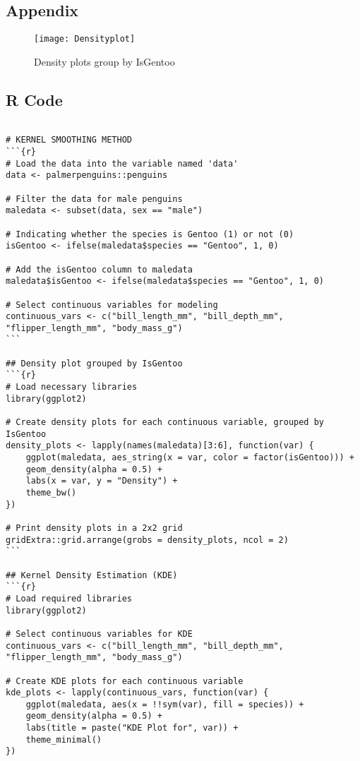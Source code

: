 \documentclass[12pt,doublespace]{article}
\begin{document}
\begin{itemize}
	\newpage
	\section* {Appendix}

	\begin{figure}[h]
		\centering
		\texttt{[image: Densityplot]}
		\caption{Density plots group by IsGentoo}
		\label{fig:densityplot}
	\end{figure}

	
	\newpage
	\subsection* {R Code}
	\begin{verbatim}
		
# KERNEL SMOOTHING METHOD
```{r}
# Load the data into the variable named 'data'
data <- palmerpenguins::penguins

# Filter the data for male penguins
maledata <- subset(data, sex == "male")

# Indicating whether the species is Gentoo (1) or not (0)
isGentoo <- ifelse(maledata$species == "Gentoo", 1, 0)

# Add the isGentoo column to maledata
maledata$isGentoo <- ifelse(maledata$species == "Gentoo", 1, 0)

# Select continuous variables for modeling
continuous_vars <- c("bill_length_mm", "bill_depth_mm", "flipper_length_mm", "body_mass_g")
```

## Density plot grouped by IsGentoo
```{r}
# Load necessary libraries
library(ggplot2)

# Create density plots for each continuous variable, grouped by IsGentoo
density_plots <- lapply(names(maledata)[3:6], function(var) {
	ggplot(maledata, aes_string(x = var, color = factor(isGentoo))) +
	geom_density(alpha = 0.5) +
	labs(x = var, y = "Density") +
	theme_bw()
})

# Print density plots in a 2x2 grid
gridExtra::grid.arrange(grobs = density_plots, ncol = 2)
```

## Kernel Density Estimation (KDE)
```{r}
# Load required libraries
library(ggplot2)

# Select continuous variables for KDE
continuous_vars <- c("bill_length_mm", "bill_depth_mm", "flipper_length_mm", "body_mass_g")

# Create KDE plots for each continuous variable
kde_plots <- lapply(continuous_vars, function(var) {
	ggplot(maledata, aes(x = !!sym(var), fill = species)) +
	geom_density(alpha = 0.5) +
	labs(title = paste("KDE Plot for", var)) +
	theme_minimal()
})


\end{verbatim}
\end{itemize}
\end{document}
